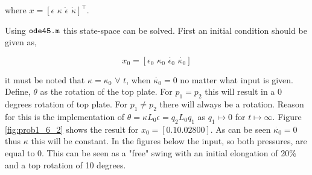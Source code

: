 where $x = [\epsilon \hspace{4pt} \kappa \hspace{4pt} \dot{\epsilon} \hspace{4pt} \dot{\kappa}]^\top$.



Using $\verb+ode45.m+$ this state-space can be solved. First an initial condition should be given as,

\begin{equation}
    x_0 = [\epsilon_0 \hspace{4pt} \kappa_0 \hspace{4pt} \dot{\epsilon_0} \hspace{4pt} \dot{\kappa_0}] 
\end{equation}


it must be noted that $\kappa = \kappa_0  \hspace{4pt}  \forall  \hspace{4pt}  t $, when $\dot{\kappa_0} = 0 $ no matter what input is given. Define, $\theta$ as the rotation of the top plate. For $p_1  = p_2$ this will result in a 0 degrees rotation of top plate. For $p_1 \neq p_2 $ there will always be a rotation. Reason for this is the implementation of $\theta = \kappa L_0 \epsilon = q_2 L_0 q_1$ as $ q_1 \mapsto 0 $ for $t \mapsto \infty$. Figure \ref{fig:prob1_6_2} shows the result for $x_0 = [0.1 0.028 0 0]$. As can be seen $\dot{\kappa_0} = 0$ thus $\kappa$ this will be constant. In the figures below the input, so both pressures, are equal to 0. This can be seen as a "free" swing with an initial elongation of 20$\%$ and a top rotation of 10 degrees.  


